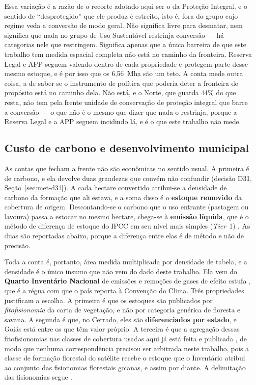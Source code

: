 Essa variação é a razão de o recorte adotado aqui ser o da Proteção Integral, e
o sentido de ``desprotegido'' que ele produz é estreito, isto é, fora do grupo cujo
regime veda a conversão de modo geral. Não significa livre para desmatar, nem
significa que nada no grupo de Uso Sustentável restrinja conversão --- há
categorias nele que restringem. Significa apenas que a única barreira de que
este trabalho tem medida espacial completa não está no caminho da fronteira.
Reserva Legal e APP seguem valendo dentro de cada propriedade e protegem parte
desse mesmo estoque, e é por isso que os 6,56~Mha são um teto. A conta mede outra coisa, a
de saber se o instrumento de política que poderia deter a fronteira de
propósito está no caminho dela. Não está, e o Norte, que guarda 44\% do que
resta, não tem pela frente unidade de conservação de proteção integral que
barre a conversão --- o que não é o mesmo que dizer que nada o restrinja, porque a
Reserva Legal e a APP seguem incidindo lá, e é o que este trabalho não mede.

\subsection{Custo de carbono e desenvolvimento municipal}
\label{sec:res-carbono}

As contas que fecham a frente não são econômicas no sentido usual. A primeira é
de carbono, e ela devolve duas grandezas que convém não confundir
(decisão D31, Seção~\ref{sec:met-d31}). A cada hectare convertido atribui-se a
densidade de carbono da formação que ali estava, e a soma disso é o \textbf{estoque
removido} da cobertura de origem. Descontando-se o carbono que o uso entrante
(pastagem ou lavoura) passa a estocar no mesmo hectare, chega-se à
\textbf{emissão líquida}, que é o método de diferença de estoque do IPCC em seu
nível mais simples (\emph{Tier}~1) \cite{IPCC2006}. As duas são reportadas abaixo,
porque a diferença entre elas é de método e não de precisão.

Toda a conta é, portanto, área medida multiplicada por densidade de tabela, e a
densidade é o único insumo que não vem do dado deste trabalho. Ela vem do
\textbf{Quarto Inventário Nacional} de emissões e remoções de gases de efeito
estufa \cite{MCTI2020}, que é a régua com que o país reporta à Convenção do
Clima. Três propriedades justificam a escolha. A primeira é que os estoques são
publicados por \emph{fitofisionomia} da carta de vegetação, e não por categoria
genérica de floresta e savana. A segunda é que, no Cerrado, eles são
\textbf{diferenciados por estado}, e Goiás está entre os que têm valor próprio.
A terceira é que a agregação dessas fitofisionomias nas classes de cobertura
usadas aqui já está feita e publicada \cite{SEEG2025}, de modo que nenhuma
correspondência precisou ser arbitrada neste trabalho, pois a classe de formação
florestal do satélite recebe o estoque que o Inventário atribui ao conjunto das
fisionomias florestais goianas, e assim por diante. A delimitação das
fisionomias segue .

